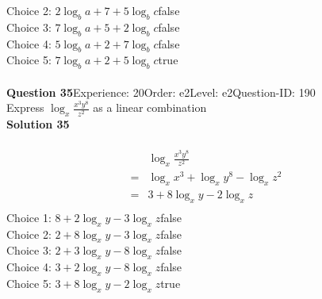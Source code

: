 \documentclass{article}
\begin{document}
Choice 2: \hspace{20pt}$2\log_{b}a+7+5\log_{b}c$\hspace{20pt}false\\
Choice 3: \hspace{20pt}$7\log_{b}a+5+2\log_{b}c$\hspace{20pt}false\\
Choice 4: \hspace{20pt}$5\log_{b}a+2+7\log_{b}c$\hspace{20pt}false\\
Choice 5: \hspace{20pt}$7\log_{b}a+2+5\log_{b}c$\hspace{20pt}true\\
\\[4pt]
\noindent\textbf{Question 35}\hspace{20pt}Experience: 20\hspace{20pt}Order: e2\hspace{20pt}Level: e2\hspace{20pt}Question-ID: 190\\[2pt]
Express $\log_{x}\displaystyle\frac{x^3y^8}{z^2}$ as a linear combination\\[4pt]
\noindent\textbf{Solution 35}\\[2pt]
\\[-35pt]\begin{align*}
&\log_{x}\displaystyle\frac{x^3y^8}{z^2}\\[2pt]
=&\log_{x}x^3+\log_{x}y^8-\log_{x}z^2\\[2pt]
=&3+8\log_{x}y-2\log_{x}z\\[-30pt]
\end{align*}
Choice 1: \hspace{20pt}$8+2\log_{x}y-3\log_{x}z$\hspace{20pt}false\\
Choice 2: \hspace{20pt}$2+8\log_{x}y-3\log_{x}z$\hspace{20pt}false\\
Choice 3: \hspace{20pt}$2+3\log_{x}y-8\log_{x}z$\hspace{20pt}false\\
Choice 4: \hspace{20pt}$3+2\log_{x}y-8\log_{x}z$\hspace{20pt}false\\
Choice 5: \hspace{20pt}$3+8\log_{x}y-2\log_{x}z$\hspace{20pt}true\\
\end{document}

